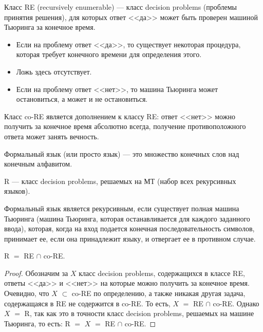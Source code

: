     \begin{Def}[Классы RE и co-RE]
        Класс RE (recursively enumerable) --- класс decision problems (проблемы принятия решения), для которых ответ <<да>> может быть проверен машиной Тьюринга за конечное время.
        \begin{itemize}
            \item Если на проблему ответ <<да>>, то существует некоторая процедура, которая требует конечного времени для определения этого.
            \item Ложь здесь отсутствует.
            \item Если на проблему ответ <<нет>>, то машина Тьюринга может остановиться, а может и не остановиться.
        \end{itemize}
        Класс co-RE является дополнением к классу RE: ответ <<нет>> можно получить за конечное время абсолютно всегда, получение противоположного ответа может занять вечность.
    \end{Def}
    \begin{Def}
        Формальный язык (или просто язык) --- это множество конечных слов над конечным алфавитом.
    \end{Def}
    \begin{Def}[Класс R]
        R --- класс decision problems, решаемых на МТ (набор всех рекурсивных языков). 
    \end{Def}
    \begin{Def} 
        Формальный язык является рекурсивным, если существует полная машина Тьюринга (машина Тьюринга, которая останавливается для каждого заданного ввода), которая, когда на вход подается конечная последовательность символов, принимает ее, если она принадлежит языку, и отвергает ее в противном случае. 
    \end{Def}
    \begin{Thm}
        R $=$ RE $\cap$ co-RE.
    \end{Thm}
    \begin{proof}
        Обозначим за $X$ класс decision problems, содержащихся в классе RE, ответы <<да>> и <<нет>> на которые можно получить за конечное время. Очевидно, что $X$ $\subset$ co-RE по определению, а также никакая другая задача, содержащаяся в RE не содержится в co-RE. То есть, $X$ $=$ RE $\cap$ co-RE. Однако $X$ $=$ R, так как это в точности класс decision problems, решаемых на машине Тьюринга, то есть: R $=$ $X$ $=$ RE $\cap$ co-RE.
    \end{proof}
    
